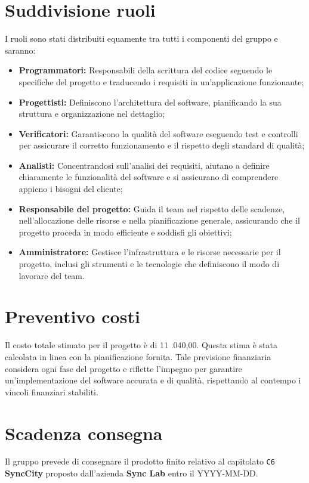 \section{Suddivisione ruoli}
I ruoli sono stati distribuiti equamente tra tutti i componenti del gruppo e saranno:
\begin{itemize}
	\item \textbf{Programmatori:} Responsabili della scrittura del codice seguendo le specifiche del progetto e traducendo i requisiti in un'applicazione funzionante;
	\item \textbf{Progettisti:} Definiscono l'architettura del software, pianificando la sua struttura e organizzazione nel dettaglio;
	\item \textbf{Verificatori:} Garantiscono la qualità del software eseguendo test e controlli per assicurare il corretto funzionamento e il rispetto degli standard di qualità;
	\item \textbf{Analisti:} Concentrandosi sull'analisi dei requisiti, aiutano a definire chiaramente le funzionalità del software e si assicurano di comprendere appieno i bisogni del cliente;
	\item \textbf{Responsabile del progetto:} Guida il team nel rispetto delle scadenze, nell'allocazione delle risorse e nella pianificazione generale, assicurando che il progetto proceda in modo efficiente e soddisfi gli obiettivi;
	\item \textbf{Amministratore:} Gestisce l'infrastruttura e le risorse necessarie per il progetto, inclusi gli strumenti e le tecnologie che definiscono il modo di lavorare del team.
\end{itemize}
\newpage
\section{Preventivo costi}
Il costo totale stimato per il progetto è di 11 .040,00\;\texteuro. Questa stima è stata calcolata in linea con la pianificazione fornita. Tale previsione finanziaria considera ogni fase del progetto e riflette l'impegno per garantire un'implementazione del software accurata e di qualità, rispettando al contempo i vincoli finanziari stabiliti. 
\section{Scadenza consegna}
Il gruppo prevede di consegnare il prodotto finito relativo al capitolato \texttt{C6} \textbf{SyncCity} proposto dall'azienda \textbf{Sync Lab} entro il YYYY-MM-DD.